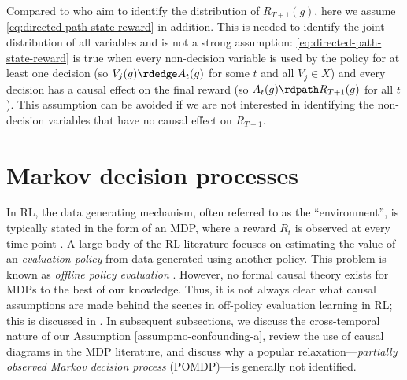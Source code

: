 \documentclass[12pt,a4paper]{article}
\theoremstyle{definition}
\begin{document}
Compared to \textcite[Corollary 34]{richardson_single_2013} who aim
to identify the distribution of $R_{T+1}(g)$, here we
assume \eqref{eq:directed-path-state-reward} in addition. This is
needed to identify the joint distribution of all variables and is not
a strong assumption: \eqref{eq:directed-path-state-reward} is true
when every non-decision variable is used by the policy for at least
one decision (so $V_j(g) \rdedge A_t(g)$ for some $t$ and all $V_j \in
X$) and every decision has a causal effect on the final reward (so
$A_t(g) \rdpath R_{T+1}(g)$ for all $t$). This assumption can be
avoided if we are not interested in identifying the non-decision
variables that have no causal effect on $R_{T+1}$.



\section{Markov decision processes}\label{sec:mdp}
In RL, the data generating mechanism, often referred to as the
``environment'', is typically stated in the form of an MDP, where a
reward $R_t$ is observed at every time-point
\parencite{sutton_reinforcement_2018,puterman_markov_2014}.
A large body of the RL literature focuses on estimating the value of an
\emph{evaluation policy} from data generated using another policy.
This problem is known as \emph{offline policy
  evaluation}
\parencite{sutton_reinforcement_2018,uehara_review_2022}. However, no
formal causal theory exists for MDPs to the
best of our knowledge. Thus, it is not
always clear what causal assumptions are made behind the scenes in
off-policy evaluation learning in RL; this is discussed in
. In subsequent subsections, we discuss the
cross-temporal nature of our Assumption
\ref{assump:no-confounding-a}, review the use of causal diagrams
in the MDP literature, and discuss why a popular
relaxation---\emph{partially observed Markov decision process}
(POMDP)---is generally not identified.
\end{document}
